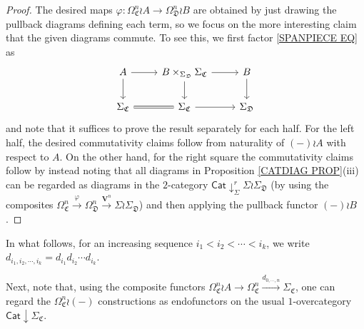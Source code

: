 \documentclass[a4paper,10pt
,draft
]{article}%
\numberwithin{equation}{section}
\numberwithin{figure}{section}
\theoremstyle{definition} %
\newcommand{\1}{\ensuremath{\mathbbm 1}}%
\begin{document}
\begin{proof}
	The desired maps 
	$\varphi \colon
	\Omega_{\mathfrak{C}}^n \wr A \to 
	\Omega_{\mathfrak{D}}^n \wr B $
	are obtained by just drawing the pullback diagrams defining each term,
	so we focus on the more interesting claim that the given diagrams commute.
	To see this, we first factor \eqref{SPANPIECE EQ} as
	\[
	\begin{tikzcd}
	A \ar{d} \ar{r} & B \times_{\Sigma_{\mathfrak{D}}} \Sigma_{\mathfrak{C}} \ar{r} \ar{d} &  \ar{d} B
	\\
	\Sigma_{\mathfrak{C}} \ar[equal]{r} & \Sigma_{\mathfrak{C}} \ar{r} & \Sigma_{\mathfrak{D}}
	\end{tikzcd}
	\]
	and note that it suffices to prove the result separately for each half.
	For the left half, the desired commutativity claims 
	follow from naturality of $(-) \wr A$ with respect to $A$.
%
	On the other hand, for the right square the commutativity claims follow by instead noting that all diagrams in 
	Proposition \ref{CATDIAG PROP}(iii)
	can be regarded as diagrams in the $2$-category
	$\mathsf{Cat} \downarrow^r_{\Sigma} \Sigma \wr \Sigma_{\mathfrak{D}}$
	(by using the composites 
	$\Omega_{\mathfrak{C}}^n \xrightarrow{\varphi} \Omega_{\mathfrak{D}}^n \xrightarrow{\boldsymbol{V}^n} \Sigma \wr \Sigma_{\mathfrak{D}}$) 
	and then applying the pullback functor $(-) \wr B$. 
\end{proof}



In what follows, 
for an increasing sequence $i_1<i_2<\cdots<i_k$,
we write
$d_{i_1,i_2,\cdots,i_k}=d_{i_1} d_{i_2} \cdots d_{i_k}$.


Next, note that, using the composite functors 
$\Omega^n_{\mathfrak{C}} \wr A \to \Omega^n_{\mathfrak{C}} 
\xrightarrow{d_{0,\cdots,n}} \Sigma_{\mathfrak{C}}$,
one can regard the $\Omega_{\mathfrak{C}}^n \wr (-)$ constructions
as endofunctors on the usual $1$-overcategory
$\mathsf{Cat} \downarrow \Sigma_{\mathfrak{C}}$.
\end{document}
